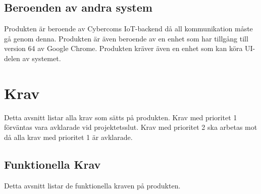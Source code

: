 \documentclass[10pt]{article}
\begin{document}
	
	\subsection{Beroenden av andra system}
	Produkten är beroende av Cybercoms IoT-backend då all kommunikation måste gå genom denna. Produkten är även beroende av en enhet som har tillgång till version 64 av Google Chrome. Produkten kräver även en enhet som kan köra UI-delen av systemet.

\pagebreak
\section{Krav}
	Detta avsnitt listar alla krav som sätts på produkten. Krav med prioritet 1 förväntas vara avklarade vid projektetsslut. Krav med prioritet 2 ska arbetas mot då alla krav med prioritet 1 är avklarade.
	\subsection{Funktionella Krav}
	Detta avsnitt listar de funktionella kraven på produkten.	
	
\end{document}
